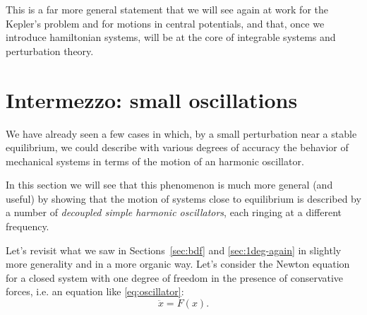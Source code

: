 \documentclass[english,fontsize=11pt,paper=a5,oneside]{scrbook}
\theoremstyle{definition}
\begin{document}
This is a far more general statement that we will see again at work for the Kepler's problem and for motions in central potentials, and that, once we introduce hamiltonian systems, will be at the core of integrable systems and perturbation theory.


\section{Intermezzo: small oscillations}\label{sec:soc}
We have already seen a few cases in which, by a small perturbation near a stable equilibrium, we could describe with various degrees of accuracy the behavior of mechanical systems in terms of the motion of an harmonic oscillator.

In this section we will see that this phenomenon is much more general (and useful) by showing that the motion of systems close to equilibrium is described by a number of \emph{decoupled simple harmonic oscillators}, each ringing at a different frequency.

Let's revisit what we saw in Sections~\ref{sec:bdf} and \ref{sec:1deg-again} in slightly more generality and in a more organic way. Let's consider the Newton equation for a closed system with one degree of freedom in the presence of conservative forces, i.e. an equation like \eqref{eq:oscillator}:
\begin{equation}
    \ddot x = F(x).
\end{equation}
\end{document}
